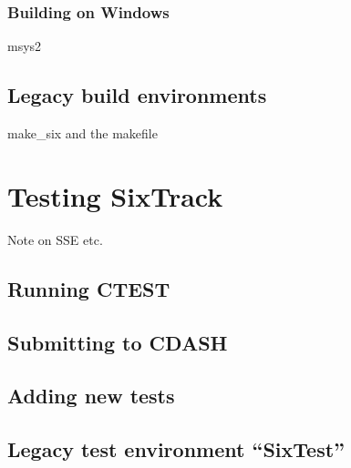\documentclass[english]{article}
\begin{document}
\subsubsection{Building on Windows}

msys2

\subsection{Legacy build environments}
make\_six and the makefile

\section{Testing SixTrack}

Note on SSE etc.

\subsection{Running CTEST}

\subsection{Submitting to CDASH}

\subsection{Adding new tests}

\subsection{Legacy test environment ``SixTest''}
\end{document}
